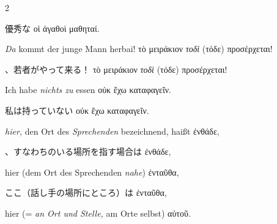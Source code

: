 \begin{paracol}{2}
\begin{enumerate}[leftmargin=0pt,rightmargin=0pt,listparindent =1cm,labelindent=1cm,labelsep=1ex,labelwidth={*},itemindent={*},align=left]
\begin{japanese}
優秀な \textgreek[variant=ancient]{οἱ ἀγαθοὶ μαθηταί.}
\end{japanese}
\switchcolumn*

\begin{german}
\item \emph{Da} kommt der junge Mann herbai! \textgreek[variant=ancient]{τὸ
μειράκιον \emph{τοδὶ} (τόδε) προσέρχεται!} 
\end{german}
\switchcolumn

\begin{japanese}
、若者がやって来る！ \textgreek[variant=ancient]{τὸ
μειράκιον \emph{τοδὶ} (τόδε) προσέρχεται!}
\end{japanese}
\switchcolumn*

\begin{german}
\item Ich habe \emph{nichts zu} essen \textgreek[variant=ancient]{οὐκ ἔχω
καταφαγεῖν.}
\end{german}
\switchcolumn

\begin{japanese}
私は持っていない \textgreek[variant=ancient]{οὐκ ἔχω
καταφαγεῖν.}
\end{japanese}
\switchcolumn*

\begin{german}
\item \emph{hier,} den Ort des \emph{Sprechenden} bezeichnend, haißt \textgreek[variant=ancient]{ἐνθάδε,}
\end{german}
\switchcolumn

\begin{japanese}
、すなわちのいる場所を指す場合は \textgreek[variant=ancient]{ἐνθάδε,}
\end{japanese}
\switchcolumn*

\begin{continuousitemline}
\begin{german}
hier (dem Ort des Sprechenden \emph{nahe})
\textgreek[variant=ancient]{ἐνταῦθα,}
\end{german}
\switchcolumn

\begin{japanese}
ここ（話し手の場所にところ）は \textgreek[variant=ancient]{ἐνταῦθα,}
\end{japanese}
\switchcolumn*

\begin{german}
hier (= \emph{an Ort und Stelle,} am Orte selbst) \textgreek[variant=ancient]{αὐτοῦ.}
\end{german}
\switchcolumn


\end{continuousitemline}
\end{enumerate}
\end{paracol}
